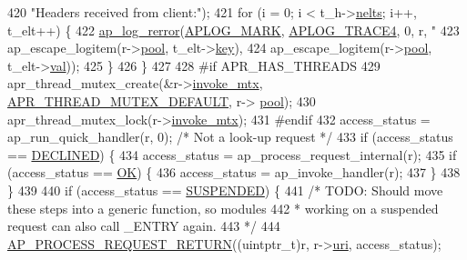 \begin{DoxyCode}
420                       \textcolor{stringliteral}{"Headers received from client:"});
421         \textcolor{keywordflow}{for} (i = 0; i < t\_h->\hyperlink{structapr__array__header__t_ab11b88220885c5a0920a06ac85680055}{nelts}; i++, t\_elt++) \{
422             \hyperlink{group__APACHE__CORE__LOG_ga4c112558ccffd6b363da102b2052d2a6}{ap\_log\_rerror}(\hyperlink{group__APACHE__CORE__LOG_ga655e126996849bcb82e4e5a14c616f4a}{APLOG\_MARK}, \hyperlink{group__APACHE__CORE__LOG_ga479289550d998526187ff78880378f9c}{APLOG\_TRACE4}, 0, r, \textcolor{stringliteral}{"  %
423                           ap\_escape\_logitem(r->\hyperlink{structrequest__rec_aa0a0c16f9a9ab3901cdb3f3c9c9d83d0}{pool}, t\_elt->\hyperlink{structapr__table__entry__t_abdccb35ea49dd95082fdce65a5a6001f}{key}),
424                           ap\_escape\_logitem(r->\hyperlink{structrequest__rec_aa0a0c16f9a9ab3901cdb3f3c9c9d83d0}{pool}, t\_elt->\hyperlink{structapr__table__entry__t_a755371d0aa6a9487b502c34807271e6f}{val}));
425         \}
426     \}
427 
428 \textcolor{preprocessor}{#if APR\_HAS\_THREADS}
429     apr\_thread\_mutex\_create(&r->\hyperlink{structrequest__rec_a788a6c1515ad8e29356808cf85b50df3}{invoke\_mtx}, \hyperlink{group__apr__thread__mutex_ga579050872f9aff06e773b084264f7d06}{APR\_THREAD\_MUTEX\_DEFAULT}, r->
      \hyperlink{structrequest__rec_aa0a0c16f9a9ab3901cdb3f3c9c9d83d0}{pool});
430     apr\_thread\_mutex\_lock(r->\hyperlink{structrequest__rec_a788a6c1515ad8e29356808cf85b50df3}{invoke\_mtx});
431 \textcolor{preprocessor}{#endif}
432     access\_status = ap\_run\_quick\_handler(r, 0);  \textcolor{comment}{/* Not a look-up request */}
433     \textcolor{keywordflow}{if} (access\_status == \hyperlink{group__APACHE__CORE__DAEMON_ga9eba11ca86461a3ae319311d64682dda}{DECLINED}) \{
434         access\_status = ap\_process\_request\_internal(r);
435         \textcolor{keywordflow}{if} (access\_status == \hyperlink{group__APACHE__CORE__DAEMON_gaba51915c87d64af47fb1cc59348961c9}{OK}) \{
436             access\_status = ap\_invoke\_handler(r);
437         \}
438     \}
439 
440     \textcolor{keywordflow}{if} (access\_status == \hyperlink{group__APACHE__CORE__DAEMON_gaeb2de2a76ea6728368042cf7a3fcd60c}{SUSPENDED}) \{
441         \textcolor{comment}{/* TODO: Should move these steps into a generic function, so modules}
442 \textcolor{comment}{         * working on a suspended request can also call \_ENTRY again.}
443 \textcolor{comment}{         */}
444         \hyperlink{apache__noprobes_8h_a3e83e02fdd53cefbd9e06297fe41d5cc}{AP\_PROCESS\_REQUEST\_RETURN}((uintptr\_t)r, r->\hyperlink{structrequest__rec_aee240e90eac55c732891e9408543990b}{uri}, access\_status);
}
\end{DoxyCode}
